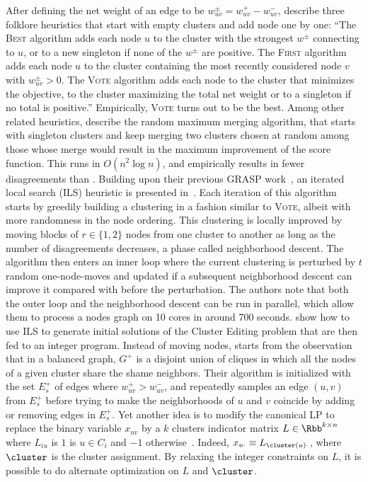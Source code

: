 After defining the net weight of an edge to be $w^\pm_{uv} = w^+_{uv} - w^-_{uv}$,
\textcite{Elsner2009} describe three folklore heuristics that start with empty clusters and add node
one by one: \enquote{The \textsc{Best} algorithm adds each node $u$ to the cluster with the
strongest $w^\pm$ connecting to $u$, or to a new singleton if none of the $w^\pm$ are positive.
The \textsc{First} algorithm adds each node $u$ to the cluster containing the most recently
considered node $v$ with $w^\pm_{uv} > 0$. The \textsc{Vote} algorithm adds each node to the cluster
that minimizes the \pcc{} objective, \ie{} to the cluster maximizing the total net weight
or to a singleton if no total is positive.} Empirically, \textsc{Vote} turns out to be the best.
Among other related heuristics, \textcite{mergingHeuristics14} describe the random maximum merging
algorithm, that starts with singleton clusters and keep merging two clusters chosen at random among
those whose merge would result in the maximum improvement of the score function. This runs in
$O(n^2\log n)$, and empirically results in fewer disagreements than \ccpivot{}.
Building upon their previous GRASP work~\autocite{GRASP13}, an iterated local search (ILS) heuristic is
presented in~\autocites{Levorato2015}{Levorato2017}. Each iteration of this algorithm starts by
greedily building a clustering in a fashion similar to \textsc{Vote}, albeit with more randomness in the
node ordering. This clustering is locally improved by moving blocks of $r\in\{1,2\}$ nodes from one
cluster to another as long as the number of disagreements decreases, a phase called neighborhood
descent. The algorithm then enters an inner loop where the current clustering is perturbed by $t$
random one-node-moves and updated if a subsequent neighborhood descent can improve it compared with
before the perturbation. The authors note that both the outer loop and the neighborhood descent can
be run in parallel, which allow them to process a  nodes graph on 10 cores in around 700
seconds. \Textcite{heuristicCE16} show how to use ILS to generate initial solutions of the Cluster
Editing problem that are then fed to an integer program.
Instead of
moving nodes, \textcite{restoreNeighborhood13} starts from the observation that in a balanced
graph, $G^+$ is a disjoint union of cliques in which all the nodes of a given cluster share the shame
neighbors. Their algorithm is initialized with the set $E_s^+$ of edges where $w^+_{uv} > w^-_{uv}$,
and repeatedly samples an edge $(u,v)$ from $E_s^+$ before trying to make the neighborhoods of $u$
and $v$ coincide by adding or removing edges in $E_s^+$.  Yet another idea is to modify the
canonical LP to replace the binary variable $x_{uv}$ by a $k$ clusters indicator matrix
$L\in\Rbb^{k\times n}$ where $L_{iu}$ is $1$ is $u\in C_i$ and $-1$
otherwise~\autocite{AltOptimLP13}. Indeed, $x_{u\cdot} \equiv L_{\cluster(u)\cdot}$, where $\cluster$
is the cluster assignment. By relaxing the integer constraints on $L$, it is possible to do
alternate optimization on $L$ and $\cluster$.

